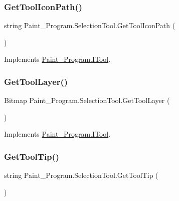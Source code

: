 \subsubsection{\texorpdfstring{Get\+Tool\+Icon\+Path()}{GetToolIconPath()}}
{\footnotesize\ttfamily string Paint\+\_\+\+Program.\+Selection\+Tool.\+Get\+Tool\+Icon\+Path (\begin{DoxyParamCaption}{ }\end{DoxyParamCaption})\hspace{0.3cm}{\ttfamily [inline]}}



Implements \mbox{\hyperlink{interface_paint___program_1_1_i_tool_aa057d2f99c59d7bec0215dcad2da1b72}{Paint\+\_\+\+Program.\+I\+Tool}}.

\mbox{\label{class_paint___program_1_1_selection_tool_ad8d0b5e9cf0486f7e3815db1536de03d}} 
\subsubsection{\texorpdfstring{Get\+Tool\+Layer()}{GetToolLayer()}}
{\footnotesize\ttfamily Bitmap Paint\+\_\+\+Program.\+Selection\+Tool.\+Get\+Tool\+Layer (\begin{DoxyParamCaption}{ }\end{DoxyParamCaption})\hspace{0.3cm}{\ttfamily [inline]}}



Implements \mbox{\hyperlink{interface_paint___program_1_1_i_tool_a9b057905515f42a988c166a6a40318e0}{Paint\+\_\+\+Program.\+I\+Tool}}.

\mbox{\label{class_paint___program_1_1_selection_tool_a27eaa7276db68cea198c96a30b3dba9e}} 
\subsubsection{\texorpdfstring{Get\+Tool\+Tip()}{GetToolTip()}}
{\footnotesize\ttfamily string Paint\+\_\+\+Program.\+Selection\+Tool.\+Get\+Tool\+Tip (\begin{DoxyParamCaption}{ }\end{DoxyParamCaption})\hspace{0.3cm}{\ttfamily [inline]}}



